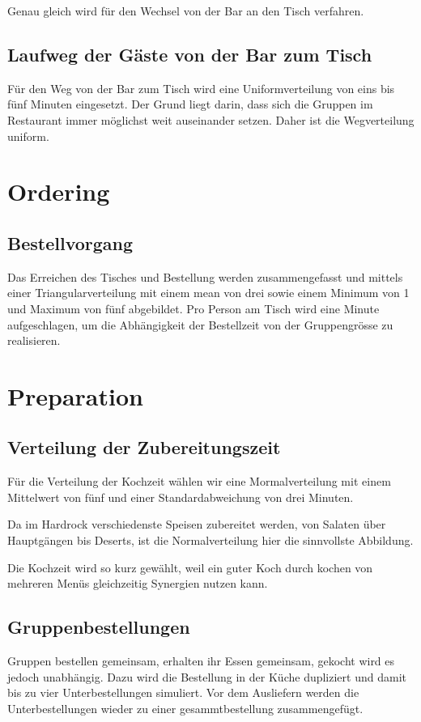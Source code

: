 \documentclass[ngerman,a4paper,12pt]{scrreprt}
\begin{document}
		Genau gleich wird für den Wechsel von der Bar an den Tisch verfahren.
	
	
		\subsection{Laufweg der Gäste von der Bar zum Tisch}
			Für den Weg von der Bar zum Tisch wird eine Uniformverteilung von eins bis fünf Minuten eingesetzt. Der Grund liegt darin, dass sich die Gruppen im Restaurant immer möglichst weit auseinander setzen. Daher ist die Wegverteilung uniform.
	
	
	\section{Ordering}			
		\subsection{Bestellvorgang}
			Das Erreichen des Tisches und Bestellung werden zusammengefasst und mittels einer Triangularverteilung mit einem mean von drei sowie einem Minimum von 1 und Maximum von fünf abgebildet. Pro Person am Tisch wird eine Minute aufgeschlagen, um die Abhängigkeit der Bestellzeit von der Gruppengrösse zu realisieren.
	
	
	\section{Preparation}	
		\subsection{Verteilung der Zubereitungszeit}
			Für die Verteilung der Kochzeit wählen wir eine Mormalverteilung mit einem Mittelwert von fünf und einer Standardabweichung von drei Minuten.
	
			Da im Hardrock verschiedenste Speisen zubereitet werden, von Salaten über Hauptgängen bis Deserts, ist die Normalverteilung hier die sinnvollste Abbildung.
	
			Die Kochzeit wird so kurz gewählt, weil ein guter Koch durch kochen von mehreren Menüs gleichzeitig Synergien nutzen kann.
	
	
		\subsection{Gruppenbestellungen}
			Gruppen bestellen gemeinsam, erhalten ihr Essen gemeinsam, gekocht wird es jedoch unabhängig. Dazu wird die Bestellung in der Küche dupliziert und damit bis zu vier Unterbestellungen simuliert. Vor dem Ausliefern werden die Unterbestellungen wieder zu einer gesammtbestellung zusammengefügt.
			
\end{document}

